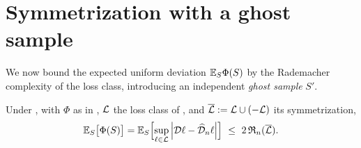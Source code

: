 \section{Symmetrization with a ghost sample}\label{sec:symmetrization}

We now bound the expected uniform deviation $\mathbb{E}_S\Phi(S)$ by the Rademacher
complexity of the loss class, introducing an independent \emph{ghost sample}
$S'$.

\begin{lemma}\label{lem:symmetrization}
Under , with $\Phi$ as in , $\mathcal{L}$ the
loss class of , and $\overline{\mathcal{L}}:=\mathcal{L}\cup(-\mathcal{L})$ its
symmetrization,
\begin{align}\label{eq:symm-bound}
\mathbb{E}_{S}\bigl[\Phi(S)\bigr]
=\mathbb{E}_{S}\Bigl[\sup_{\ell\in\mathcal{L}}\left| \mathcal{D}\ell-\widehat{\mathcal{D}}_n\ell \right|\Bigr]
\ \le\ 2\,\mathfrak{R}_n(\overline{\mathcal{L}}).
\end{align}
\end{lemma}

